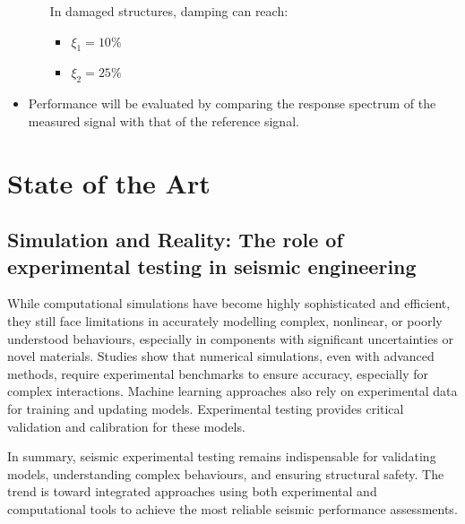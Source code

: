 \documentclass[9pt]{extarticle}
\begin{document}
\begin{itemize}
\begin{itemize}[label=$\diamond$]
    In damaged structures, damping can reach:
    \begin{itemize}
        \item $\xi_1 = 10\%$
        \item $\xi_2 = 25\%$
    \end{itemize}
    \end{itemize}

    \item Performance will be evaluated by comparing the response spectrum of the measured signal with that of the reference signal.
\end{itemize}


\section{State of the Art} %

\subsection{Simulation and Reality: The role of experimental testing in seismic engineering}
While computational simulations have become highly sophisticated and efficient, they still face limitations in accurately modelling complex, nonlinear, or poorly understood behaviours, especially in components with significant uncertainties or novel materials. 
Studies show that numerical simulations, even with advanced methods, require experimental benchmarks to ensure accuracy, especially for complex interactions. Machine learning approaches also rely on experimental data for training and updating models. Experimental testing provides critical validation and calibration for these models.

In summary, seismic experimental testing remains indispensable for validating models, understanding complex behaviours, and ensuring structural safety. The trend is toward integrated approaches using both experimental and computational tools to achieve the most reliable seismic performance assessments.\citep{williams2001,Zhang2023Experimentally,Liu2020Experimental,Bahraq2021Numerical,Malomo2022M-DEM,Qiu2024Seismic,Yavas2023A,Mokhtari2023A}
\end{document}
